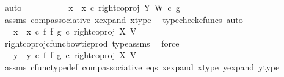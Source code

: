 \begin{isabellebody}
\ auto\ \isanewline
\ \ \ \ \isamarkupfalse%
\ \isamarkupfalse%
\ {\isachardoublequoteopen}{\isachardot}{\kern0pt}{\isachardot}{\kern0pt}{\isachardot}{\kern0pt}\ {\isacharequal}{\kern0pt}\ {\isacharparenleft}{\kern0pt}x{}\ {\isasymamalg}\ x{}{\isacharparenright}{\kern0pt}\ {\isasymcirc}\isactrlsub c\ right{\isacharunderscore}{\kern0pt}coproj\ Y\ W\ {\isasymcirc}\isactrlsub c\ g{\isachardoublequoteclose}\isanewline
\ \ \ \ \ \ \isamarkupfalse%
\ assms\ comp{\isacharunderscore}{\kern0pt}associative{}\ x{\isacharunderscore}{\kern0pt}expand\ x{\isacharunderscore}{\kern0pt}type\ \isamarkupfalse%
\ {\isacharparenleft}{\kern0pt}typecheck{\isacharunderscore}{\kern0pt}cfuncs{\isacharcomma}{\kern0pt}\ auto{\isacharparenright}{\kern0pt}\isanewline
\ \ \ \ \isamarkupfalse%
\ \isamarkupfalse%
\ {\isachardoublequoteopen}{\isachardot}{\kern0pt}{\isachardot}{\kern0pt}{\isachardot}{\kern0pt}\ {\isacharequal}{\kern0pt}\ {\isacharparenleft}{\kern0pt}x{}\ {\isasymamalg}\ x{}{\isacharparenright}{\kern0pt}\ {\isasymcirc}\isactrlsub c\ {\isacharparenleft}{\kern0pt}f\ {\isasymbowtie}\isactrlsub f\ g{\isacharparenright}{\kern0pt}\ {\isasymcirc}\isactrlsub c\ right{\isacharunderscore}{\kern0pt}coproj\ X\ V{\isachardoublequoteclose}\isanewline
\ \ \ \ \ \ \isamarkupfalse%
\ right{\isacharunderscore}{\kern0pt}coproj{\isacharunderscore}{\kern0pt}cfunc{\isacharunderscore}{\kern0pt}bowtie{\isacharunderscore}{\kern0pt}prod\ type{\isacharunderscore}{\kern0pt}assms\ \isamarkupfalse%
\ force\isanewline
\ \ \ \ \isamarkupfalse%
\ \isamarkupfalse%
\ {\isachardoublequoteopen}{\isachardot}{\kern0pt}{\isachardot}{\kern0pt}{\isachardot}{\kern0pt}\ {\isacharequal}{\kern0pt}\ {\isacharparenleft}{\kern0pt}y{}\ {\isasymamalg}\ y{}{\isacharparenright}{\kern0pt}\ {\isasymcirc}\isactrlsub c\ {\isacharparenleft}{\kern0pt}f\ {\isasymbowtie}\isactrlsub f\ g{\isacharparenright}{\kern0pt}\ {\isasymcirc}\isactrlsub c\ right{\isacharunderscore}{\kern0pt}coproj\ X\ V{\isachardoublequoteclose}\isanewline
\ \ \ \ \ \ \isamarkupfalse%
\ assms\ cfunc{\isacharunderscore}{\kern0pt}type{\isacharunderscore}{\kern0pt}def\ comp{\isacharunderscore}{\kern0pt}associative\ eqs\ x{\isacharunderscore}{\kern0pt}expand\ x{\isacharunderscore}{\kern0pt}type\ y{\isacharunderscore}{\kern0pt}expand\ y{\isacharunderscore}{\kern0pt}type\ \isamarkupfalse%

\end{isabellebody}
